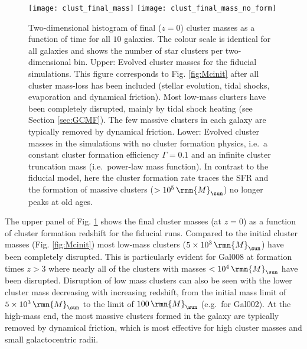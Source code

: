 \documentclass[fleqn,usenatbib]{mnras}
\newcommand\Msun{\,\rmn{M}_{\sun}}
\newcommand{\numgal}{10}
\begin{document}
\begin{figure*}
  \texttt{[image: clust\_final\_mass]}
  \texttt{[image: clust\_final\_mass\_no\_form]}
  \caption{ Two-dimensional histogram of final ($z=0$) cluster masses as a function of time for all $\numgal$ galaxies. The colour scale is identical for all galaxies and shows the number of star clusters per two-dimensional bin. Upper: Evolved cluster masses for the fiducial simulations. This figure corresponds to Fig. \ref{fig:Mcinit} after all cluster mass-loss has been included (stellar evolution, tidal shocks, evaporation and dynamical friction). Most low-mass clusters have been completely disrupted, mainly by tidal shock heating (see Section \ref{sec:GCMF}). The few massive clusters in each galaxy are typically removed by dynamical friction. Lower: Evolved cluster masses in the simulations with no cluster formation physics, i.e.~a constant cluster formation efficiency $\Gamma=0.1$ and an infinite cluster truncation mass (i.e.~power-law mass function). In contrast to the fiducial model, here the cluster formation rate traces the SFR and the formation of massive clusters ($>10^5 \Msun$) no longer peaks at old ages.}
  \label{fig:Mcfin}
\end{figure*}

The upper panel of Fig. \ref{fig:Mcfin} shows the final cluster masses (at $z=0$) as a function of cluster formation redshift for the fiducial runs. Compared to the initial cluster masses (Fig. \ref{fig:Mcinit}) most low-mass clusters ($5\times 10^3 \Msun$) have been completely disrupted. This is particularly evident for Gal008 at formation times $z>3$ where nearly all of the clusters with masses $<10^4 \Msun$ have been disrupted.
Disruption of low mass clusters can also be seen with the lower cluster mass decreasing with increasing redshift, from the initial mass limit of $5 \times 10^3 \Msun$ to the limit of $100 \Msun$ (e.g.~for Gal002).
At the high-mass end, the most massive clusters formed in the galaxy are typically removed by dynamical friction, which is most effective for high cluster masses and small galactocentric radii.
\end{document}
